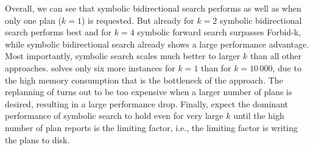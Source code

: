 Overall, we can see that symbolic bidirectional search performs as well as \forbidk{} when only one plan ($k=1$) is requested.
But already for $k=2$ symbolic bidirectional search performs best and for $k=4$ symbolic forward search surpasses Forbid-k, while symbolic bidirectional search already shows a large performance advantage.
Most importantly, symbolic search scales much better to larger $k$ than all other approaches.
\kstar{} solves only six more instances for $k = 1$ than for $k = 10\,000$, due to the high memory consumption that is the bottleneck of the approach.
The replanning of \forbidk{} turns out to be too expensive when a larger number of plans is desired, resulting in a large performance drop.
Finally, \textcite{speck-et-al-aaai2020} expect the dominant performance of symbolic search to hold even for very large $k$ until the high number of plan reports is the limiting factor, i.e., the limiting factor is writing the plans to disk.
